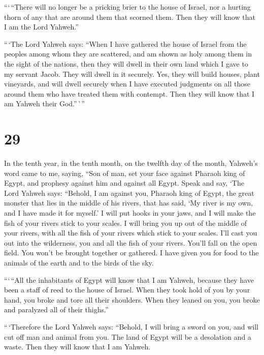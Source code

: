  ```\,``There will no longer be a pricking brier to the
house of Israel, nor a hurting thorn of any that are around them that
scorned them. Then they will know that I am the Lord Yahweh.''

 ``\,`The Lord Yahweh says: ``When I have gathered the
house of Israel from the peoples among whom they are scattered, and am
shown as holy among them in the sight of the nations, then they will
dwell in their own land which I gave to my servant Jacob. 
They will dwell in it securely. Yes, they will build houses, plant
vineyards, and will dwell securely when I have executed judgments on all
those around them who have treated them with contempt. Then they will
know that I am Yahweh their God.''\,'\,''

\hypertarget{section-27}{%
\section{29}\label{section-27}}

 In the tenth year, in the tenth month, on the twelfth day
of the month, Yahweh's word came to me, saying,  ``Son of
man, set your face against Pharaoh king of Egypt, and prophesy against
him and against all Egypt.  Speak and say, `The Lord Yahweh
says: ``Behold, I am against you, Pharaoh king of Egypt, the great
monster that lies in the middle of his rivers, that has said, `My river
is my own, and I have made it for myself.'  I will put hooks
in your jaws, and I will make the fish of your rivers stick to your
scales. I will bring you up out of the middle of your rivers, with all
the fish of your rivers which stick to your scales.  I'll
cast you out into the wilderness, you and all the fish of your rivers.
You'll fall on the open field. You won't be brought together or
gathered. I have given you for food to the animals of the earth and to
the birds of the sky.

 ```\,``All the inhabitants of Egypt will know that I am
Yahweh, because they have been a staff of reed to the house of Israel.
 When they took hold of you by your hand, you broke and tore
all their shoulders. When they leaned on you, you broke and paralyzed
all of their thighs.''

 ``\,`Therefore the Lord Yahweh says: ``Behold, I will bring
a sword on you, and will cut off man and animal from you. 
The land of Egypt will be a desolation and a waste. Then they will know
that I am Yahweh.

